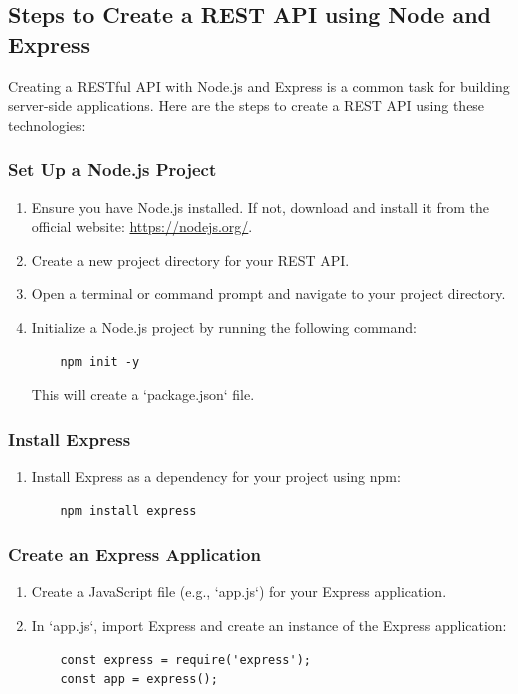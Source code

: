 \documentclass[11pt]{article}
\begin{document}
\subsection{Steps to Create a REST API using Node and Express}

Creating a RESTful API with Node.js and Express is a common task for building server-side applications. Here are the steps to create a REST API using these technologies:

\subsubsection{Set Up a Node.js Project}

\begin{enumerate}
    \item Ensure you have Node.js installed. If not, download and install it from the official website: \url{https://nodejs.org/}.
    \item Create a new project directory for your REST API.
    \item Open a terminal or command prompt and navigate to your project directory.
    \item Initialize a Node.js project by running the following command:
          \begin{verbatim}
    npm init -y
    \end{verbatim}
          This will create a `package.json` file.
\end{enumerate}

\subsubsection{Install Express}

\begin{enumerate}
    \item Install Express as a dependency for your project using npm:
          \begin{verbatim}
    npm install express
    \end{verbatim}
\end{enumerate}

\subsubsection{Create an Express Application}

\begin{enumerate}
    \item Create a JavaScript file (e.g., `app.js`) for your Express application.
    \item In `app.js`, import Express and create an instance of the Express application:
          \begin{verbatim}
    const express = require('express');
    const app = express();
    \end{verbatim}
\end{enumerate}
\end{document}
